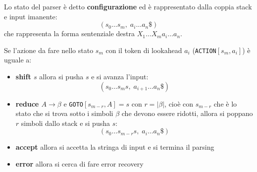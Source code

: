 \documentclass[a4paper]{article}
\begin{document}
\vspace{1em}
\noindent
Lo stato del parser è detto \textbf{configurazione} ed è rappresentato dalla coppia
stack e input imanente:
\[
  \left( s_0 \ldots s_m,\; a_i \ldots a_n\$ \right)
\] 
che rappresenta la forma sentenziale destra \( X_1 \ldots X_m a_i \ldots a_n \).

Se l'azione da fare nello stato \( s_m \) con il token di lookahead \( a_i \)
(\texttt{ACTION}\( [s_m, a_i] \)) è uguale a:
\begin{itemize}
  \item \textbf{shift \( s \)} allora si pusha \( s \) e si avanza l'input:
    \[
      \left( s_0 \ldots s_m s,\; a_{ i+1 } \ldots a_n\$ \right)
    \] 

  \item \textbf{reduce \( A \to \beta \)} e \texttt{GOTO}\( [s_{m-r}, A] = s \) 
    con \( r = |\beta| \), cioè con \( s_{m-r} \) che è lo stato che si trova sotto i
    simboli \( \beta \) che devono essere ridotti, allora si poppano \( r \) simboli
    dallo stack e si pusha \( s \):
    \[
      \left( s_0 \ldots s_{m-r} s, \; a_i \ldots a_n \$ \right) 
    \] 

  \item \textbf{accept} allora si accetta la stringa di input e si termina il parsing
  \item \textbf{error} allora si cerca di fare error recovery
\end{itemize}
\end{document}
